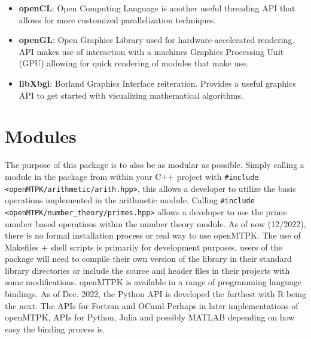 \documentclass[12pt, letterpaper]{article}
\begin{document}
\begin{sloppypar}
\begin{flushleft}
\begin{itemize}
\item \textbf{openCL}: Open Computing Language is another useful threading API that allows for
more customized parallelization techniques. 

\item \textbf{openGL}: Open Graphics Library used for hardware-accelerated rendering. API
makes use of interaction with a machines Graphics Processing Unit (GPU) allowing for quick
rendering of modules that make use.

\item \textbf{libXbgi}: Borland Graphics Interface reiteration. Provides a useful graphics API
to get started with visualizing mathematical algorithms.

\end{itemize}


\section{Modules}
The purpose of this package is to also be as modular as possible. Simply calling a module in 
the package from within your C++ project with \verb|#include <openMTPK/arithmetic/arith.hpp>|, 
this allows a developer to utilize the basic operations implemented in the arithmetic module.
Calling \verb|#include <openMTPK/number_theory/primes.hpp>| allows a developer to use the 
prime number based operations within the number theory module. \linebreak
As of now (12/2022), there is no formal installation process or real way to use openMTPK.
The use of Makefiles + shell scripts is primarily for development purposes, users of the 
package will need to compile their own version of the library in their standard
library directories or include the source and header files in their projects with some 
modifications. \linebreak
openMTPK is available in a range of programming language bindings. As of Dec. 2022, the 
Python API is developed the furthest with R being the next. The APIs for Fortran and OCaml 
Perhaps in later implementations of openMTPK, APIs for Python, Julia and possibly MATLAB 
depending on how easy the binding process is. 


\end{flushleft}
\end{sloppypar}
\end{document}
